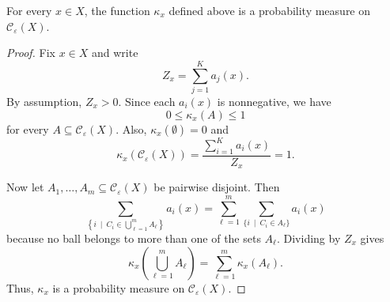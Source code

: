 \documentclass[10pt,a4paper]{amsart}
\begin{document}
\begin{proposition}
For every $x\in X$, the function $\kappa_x$ defined above is a probability measure on $\mathcal C_\varepsilon(X)$.
\end{proposition}

\begin{proof}
Fix $x\in X$ and write
\[
Z_x=\sum_{j=1}^K a_j(x).
\]
By assumption, $Z_x > 0$. Since each $a_i(x)$ is nonnegative, we have
\[
0\le \kappa_x(A)\le 1
\]
for every $A\subseteq\mathcal C_\varepsilon(X)$. Also, $\kappa_x(\emptyset)=0$ and
\[
\kappa_x(\mathcal C_\varepsilon(X)) = \frac{\sum_{i=1}^K a_i(x)}{Z_x} = 1.
\]

Now let $A_1,\dots,A_m\subseteq \mathcal C_\varepsilon(X)$ be pairwise disjoint. Then
\[
\sum_{\left\{i \ \mid \ C_i\in \bigcup_{\ell=1}^m A_\ell\right\}} a_i(x) =\sum_{\ell=1}^m \sum_{\{i \ \mid \ C_i\in A_\ell\}} a_i(x)
\]
because no ball belongs to more than one of the sets $A_\ell$. Dividing by $Z_x$ gives
\[
\kappa_x\left(\bigcup_{\ell=1}^m A_\ell\right) = \sum_{\ell=1}^m \kappa_x(A_\ell).
\]
Thus, $\kappa_x$ is a probability measure on $\mathcal C_\varepsilon(X)$.
\end{proof}
\end{document}
